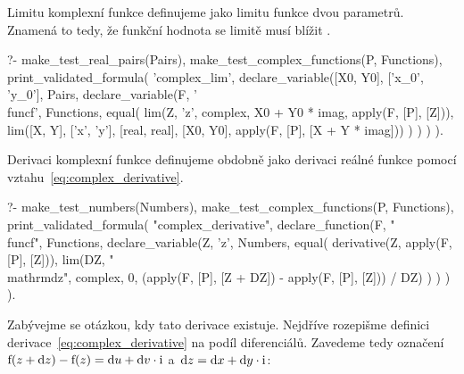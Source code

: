 Limitu komplexní funkce definujeme jako limitu funkce dvou parametrů. Znamená to tedy, že funkční hodnota se limitě musí blížit .

\begin{prolog}
?-	make_test_real_pairs(Pairs),
	make_test_complex_functions(P, Functions),
	print_validated_formula(
		'complex_lim',
		declare_variable([X0, Y0], ['x_0', 'y_0'], Pairs,
			declare_variable(F, '\\func{f}', Functions,
				equal(
					lim(Z, 'z', complex, X0 + Y0 * imag, apply(F, [P], [Z])),
					lim([X, Y], ['x', 'y'], [real, real], [X0, Y0], apply(F, [P], [X + Y * imag]))
				)
			)
		)
	).
\end{prolog}

Derivaci komplexní funkce definujeme obdobně jako derivaci reálné funkce pomocí vztahu~\eqref{eq:complex_derivative}.

\begin{prolog}
?-	make_test_numbers(Numbers),
	make_test_complex_functions(P, Functions),
	print_validated_formula(
		"complex_derivative",
		declare_function(F, "\\func{f}", Functions,
			declare_variable(Z, 'z', Numbers,
				equal(
					derivative(Z, apply(F, [P], [Z])),
					lim(DZ, "\\mathrm{d}z", complex, 0, (apply(F, [P], [Z + DZ]) - apply(F, [P], [Z])) / DZ)
				)
			)
		)
	).
\end{prolog}

Zabývejme se otázkou, kdy tato derivace existuje. Nejdříve rozepišme definici derivace~\eqref{eq:complex_derivative} na podíl diferenciálů. Zavedeme tedy označení \(\mathrm{f}(z + \mathrm{d}z) - \mathrm{f}(z) = \mathrm{d}u + \mathrm{d}v \cdot \mathrm{i}\) a~\(\mathrm{d}z = \mathrm{d}x + \mathrm{d}y \cdot \mathrm{i}\):

